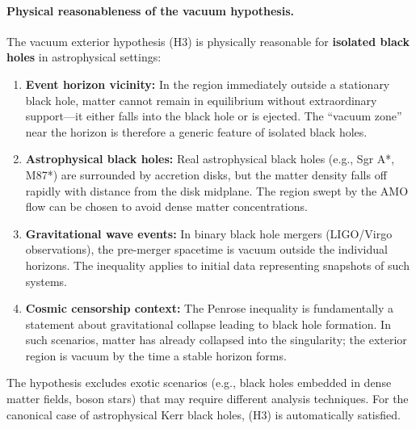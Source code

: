 \begin{remark}
\paragraph{Physical reasonableness of the vacuum hypothesis.}
The vacuum exterior hypothesis (H3) is physically reasonable for \textbf{isolated black holes} in astrophysical settings:
\begin{enumerate}
    \item \textbf{Event horizon vicinity:} In the region immediately outside a stationary black hole, matter cannot remain in equilibrium without extraordinary support---it either falls into the black hole or is ejected. The ``vacuum zone'' near the horizon is therefore a generic feature of isolated black holes.
    \item \textbf{Astrophysical black holes:} Real astrophysical black holes (e.g., Sgr A*, M87*) are surrounded by accretion disks, but the matter density falls off rapidly with distance from the disk midplane. The region swept by the AMO flow can be chosen to avoid dense matter concentrations.
    \item \textbf{Gravitational wave events:} In binary black hole mergers (LIGO/Virgo observations), the pre-merger spacetime is vacuum outside the individual horizons. The inequality applies to initial data representing snapshots of such systems.
    \item \textbf{Cosmic censorship context:} The Penrose inequality is fundamentally a statement about gravitational collapse leading to black hole formation. In such scenarios, matter has already collapsed into the singularity; the exterior region is vacuum by the time a stable horizon forms.
\end{enumerate}
The hypothesis excludes exotic scenarios (e.g., black holes embedded in dense matter fields, boson stars) that may require different analysis techniques. For the canonical case of astrophysical Kerr black holes, (H3) is automatically satisfied.
\end{remark}

